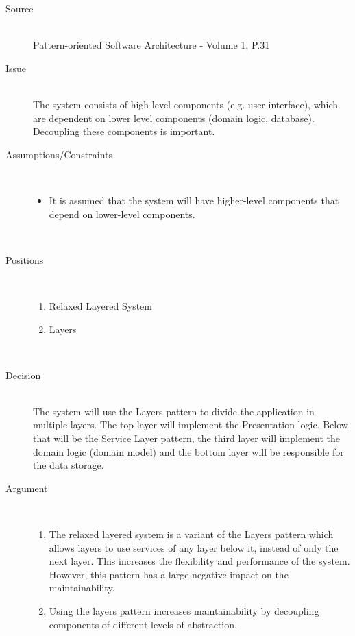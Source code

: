 \begin{description}
\item [Source]~\\
Pattern-oriented Software Architecture - Volume 1, P.31 \cite{wiley-1}

\item [Issue]~\\
The system consists of high-level components (e.g. user interface), which are dependent on lower level components (domain logic, database). Decoupling these components is important.

\item [Assumptions/Constraints]~
\begin{itemize}
\item It is assumed that the system will have higher-level components that depend on lower-level components.
\end{itemize}
~\\[-1.5cm]

\item [Positions]~
\begin{enumerate}
\item Relaxed Layered System
\item Layers
\end{enumerate}
~\\[-1.5cm]

\item [Decision] ~\\
The system will use the Layers pattern to divide the application in multiple layers. The top layer will implement the Presentation logic. Below that will be the Service Layer pattern, the third layer will implement the domain logic (domain model) and the bottom layer will be responsible for the data storage.

\item [Argument]~
\begin{enumerate}
\item The relaxed layered system is a variant of the Layers pattern which allows layers to use services of any layer below it, instead of only the next layer. This increases the flexibility and performance of the system. However, this pattern has a large negative impact on the maintainability.

\item 
Using the layers pattern increases maintainability by decoupling components of different levels of abstraction.

\end{enumerate}


\end{description}
